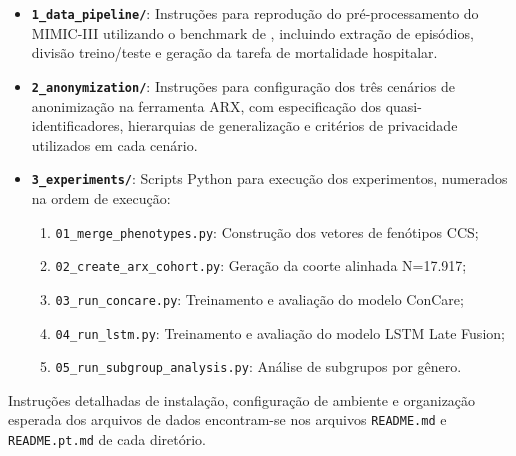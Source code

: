 \begin{itemize}
    \item \textbf{\texttt{1\_data\_pipeline/}}: Instruções para reprodução do pré-processamento do MIMIC-III utilizando o benchmark de , incluindo extração de episódios, divisão treino/teste e geração da tarefa de mortalidade hospitalar.

    \item \textbf{\texttt{2\_anonymization/}}: Instruções para configuração dos três cenários de anonimização na ferramenta ARX, com especificação dos quasi-identificadores, hierarquias de generalização e critérios de privacidade utilizados em cada cenário.

    \item \textbf{\texttt{3\_experiments/}}: Scripts Python para execução dos experimentos, numerados na ordem de execução:
    \begin{enumerate}
        \item \texttt{01\_merge\_phenotypes.py}: Construção dos vetores de fenótipos CCS;
        \item \texttt{02\_create\_arx\_cohort.py}: Geração da coorte alinhada N=17.917;
        \item \texttt{03\_run\_concare.py}: Treinamento e avaliação do modelo ConCare;
        \item \texttt{04\_run\_lstm.py}: Treinamento e avaliação do modelo LSTM Late Fusion;
        \item \texttt{05\_run\_subgroup\_analysis.py}: Análise de subgrupos por gênero.
    \end{enumerate}
\end{itemize}

Instruções detalhadas de instalação, configuração de ambiente e organização esperada dos arquivos de dados encontram-se nos arquivos \texttt{README.md} e \texttt{README.pt.md} de cada diretório.
